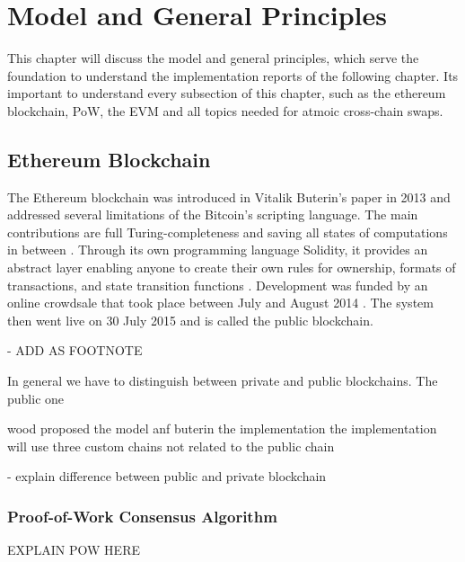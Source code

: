 \chapter{Model and General Principles}
\label{ch:background}

This chapter will discuss the model and general principles, which serve the foundation to understand the implementation reports of the following chapter. Its important to understand every subsection of this chapter, such as the ethereum blockchain, \ac{PoW}, the \ac{EVM} and all topics needed for atmoic cross-chain swaps. 


%
%
\section{Ethereum Blockchain}
\label{sec:background:first_section}
The Ethereum blockchain was introduced in Vitalik Buterin’s paper in 2013 \cite{buterin2013ethereum} and addressed several limitations of the Bitcoin’s scripting language. The main contributions are full Turing-completeness and saving all states of computations in between \cite{dannen2017introducing}.
Through its own programming language Solidity, it provides an abstract layer enabling anyone to create their own rules for ownership, formats of transactions, and state transition functions \cite{vujivcic2018blockchain}. Development was funded by an online crowdsale that took place between July and August 2014 \cite{tapscott2016blockchain}. The system then went live on 30 July 2015  and is called the public blockchain.



- ADD AS FOOTNOTE 

In general we have to distinguish between private and public blockchains. The public one 

wood proposed the model anf buterin the implementation
the implementation will use three custom chains not related to the public chain 

- explain difference between public and private blockchain


\subsection{Proof-of-Work Consensus Algorithm}
\label{subsec:background:first_section:second_subsection}
EXPLAIN POW HERE


